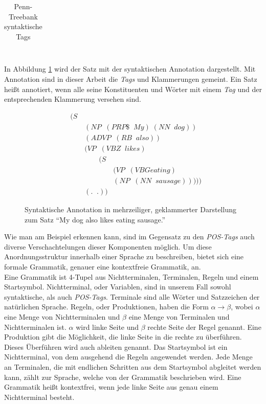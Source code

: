 \begin{table}
\begin{tabular}{ | l p{7cm} p{4cm} |}
	\hline
\end{tabular}
\caption{Penn-Treebank syntaktische Tags \cite{penntagsetAusfuehrlich}} %
\label{tab:phrase-tags}
\end{table}
\\
In Abbildung \ref{fig:multiline-annotated-dog-eating} wird der Satz mit der syntaktischen Annotation dargestellt. Mit Annotation sind in dieser Arbeit die \textit{Tags} und Klammerungen gemeint. Ein Satz heißt annotiert, wenn alle seine Konstituenten und Wörter mit einem \textit{Tag} und der entsprechenden Klammerung versehen sind.\\
\begin{figure}
\begin{align}
&(S \nonumber \\ 
& \qquad (NP \;\;(PRP\$ \;\; My)\; (NN \;\; dog)) \nonumber \\
& \qquad (ADVP \;\;(RB \;\; also)) \nonumber \\
& \qquad (VP \;\;(VBZ \;\; likes) \nonumber \\
& \qquad \qquad (S \nonumber \\
& \qquad \qquad \qquad (VP \;\;(VBG eating) \nonumber \\
& \qquad \qquad \qquad (NP \;\;(NN \;\; sausage)))))\nonumber \\
& \qquad (. \;\; .)) \nonumber
\end{align}
\caption{Syntaktische Annotation in mehrzeiliger, geklammerter Darstellung zum Satz ``My dog also likes eating sausage.''}
\label{fig:multiline-annotated-dog-eating}
\end{figure}
Wie man am Beispiel erkennen kann, sind im Gegensatz zu den \textit{POS-Tags} auch diverse Verschachtelungen dieser Komponenten möglich. Um diese Anordnungsstruktur innerhalb einer Sprache zu beschreiben, bietet sich eine formale Grammatik, genauer eine kontextfreie Grammatik, an.\\ %
Eine Grammatik ist 4-Tupel aus Nichtterminalen, Terminalen, Regeln und einem Startsymbol. Nichtterminal, oder Variablen, sind in unserem Fall sowohl syntaktische, als auch \textit{POS-Tags}. Terminale sind alle Wörter und Satzzeichen der natürlichen Sprache. Regeln, oder Produktionen, haben die Form \( \alpha \to \beta\), wobei \(\alpha\) eine Menge von Nichtterminalen und \(\beta\) eine Menge von Terminalen und Nichtterminalen ist. \(\alpha\) wird linke Seite und \(\beta\) rechte Seite der Regel genannt. Eine Produktion gibt die Möglichkeit, die linke Seite in die rechte zu überführen. Dieses Überführen wird auch ableiten genannt. Das Startsymbol ist ein Nichtterminal, von dem ausgehend die Regeln angewendet werden. Jede Menge an Terminalen, die mit endlichen Schritten aus dem Startsymbol abgleitet werden kann, zählt zur Sprache, welche von der Grammatik beschrieben wird. Eine Grammatik heißt kontextfrei, wenn jede linke Seite aus genau einem Nichtterminal besteht. \cite[Kapitel 4]{ti}\\
